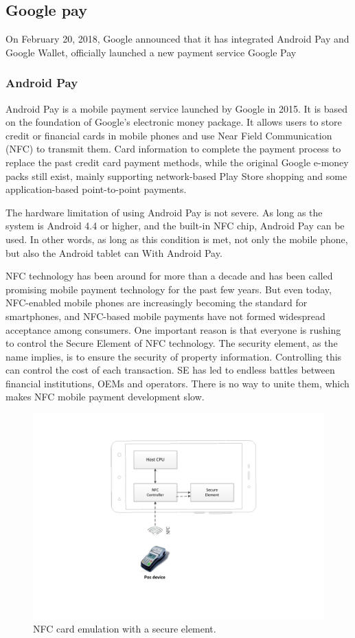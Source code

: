 \documentclass[journal]{IEEEtran}
\begin{document}
\subsection{Google pay}
On February 20, 2018, Google announced that it has integrated Android Pay and Google Wallet, officially launched a new payment service Google Pay

\subsubsection{Android Pay}Android Pay is a mobile payment service launched by Google in 2015. It is based on the foundation of Google's electronic money package. It allows users to store credit or financial cards in mobile phones and use Near Field Communication (NFC) to transmit them. Card information to complete the payment process to replace the past credit card payment methods, while the original Google e-money packs still exist, mainly supporting network-based Play Store shopping and some application-based point-to-point payments.

The hardware limitation of using Android Pay is not severe. As long as the system is Android 4.4 or higher, and the built-in NFC chip, Android Pay can be used. In other words, as long as this condition is met, not only the mobile phone, but also the Android tablet can With Android Pay.


NFC technology has been around for more than a decade and has been called promising mobile payment technology for the past few years. But even today, NFC-enabled mobile phones are increasingly becoming the standard for smartphones, and NFC-based mobile payments have not formed widespread acceptance among consumers. One important reason is that everyone is rushing to control the Secure Element of NFC technology. The security element, as the name implies, is to ensure the security of property information. Controlling this can control the cost of each transaction. SE has led to endless battles between financial institutions, OEMs and operators. There is no way to unite them, which makes NFC mobile payment development slow.

\begin{figure}[htbp]
\centerline{\includegraphics[scale=0.6]{NFC_se.pdf}}
\caption{NFC card emulation with a secure element.}
\label{fig}
\end{figure}
\end{document}
